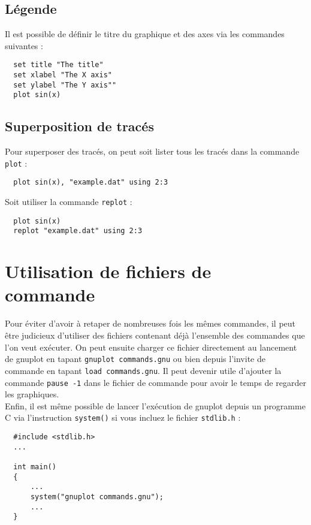 \documentclass [a4paper]{article}
\begin{document}
\subsection{Légende}

\noindent
Il est possible de définir le titre du graphique et des axes via les commandes suivantes :

\begin{verbatim}
  set title "The title"
  set xlabel "The X axis"
  set ylabel "The Y axis""
  plot sin(x)
\end{verbatim}

\subsection{Superposition de tracés}

\noindent
Pour superposer des tracés, on peut soit lister tous les tracés dans la commande \verb?plot? :

\begin{verbatim}
  plot sin(x), "example.dat" using 2:3
\end{verbatim}

\noindent
Soit utiliser la commande \verb?replot? :

\begin{verbatim}
  plot sin(x)
  replot "example.dat" using 2:3
\end{verbatim}

\section{Utilisation de fichiers de commande}

Pour éviter d'avoir à retaper de nombreuses fois les mêmes commandes, il peut être judicieux d'utiliser des fichiers contenant déjà l'ensemble des commandes que l'on veut exécuter. On peut ensuite charger ce fichier directement au lancement de gnuplot en tapant \verb?gnuplot commands.gnu? ou bien depuis l'invite de commande en tapant \verb?load commands.gnu?. Il peut devenir utile d'ajouter la commande \verb?pause -1? dans le fichier de commande pour avoir le temps de regarder les graphiques.\\

Enfin, il est même possible de lancer l'exécution de gnuplot depuis un programme C via l'instruction \verb?system()? si vous incluez le fichier \verb?stdlib.h? :

\begin{verbatim}
  #include <stdlib.h>
  ...

  int main()
  {
      ...
      system("gnuplot commands.gnu");
      ...
  }
\end{verbatim}
\end{document}
